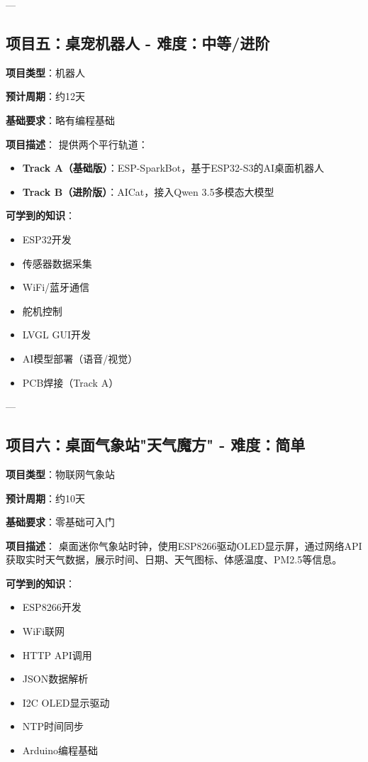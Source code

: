 \documentclass[12pt,a4paper]{article}
\begin{document}
---

\subsection{项目五：桌宠机器人 - 难度：中等/进阶}

\textbf{项目类型}：机器人

\textbf{预计周期}：约12天

\textbf{基础要求}：略有编程基础

\textbf{项目描述}：
提供两个平行轨道：
\begin{itemize}
    \item \textbf{Track A（基础版）}：ESP-SparkBot，基于ESP32-S3的AI桌面机器人
    \item \textbf{Track B（进阶版）}：AICat，接入Qwen 3.5多模态大模型
\end{itemize}

\textbf{可学到的知识}：
\begin{itemize}
    \item ESP32开发
    \item 传感器数据采集
    \item WiFi/蓝牙通信
    \item 舵机控制
    \item LVGL GUI开发
    \item AI模型部署（语音/视觉）
    \item PCB焊接（Track A）
\end{itemize}

---

\subsection{项目六：桌面气象站"天气魔方" - 难度：简单}

\textbf{项目类型}：物联网气象站

\textbf{预计周期}：约10天

\textbf{基础要求}：零基础可入门

\textbf{项目描述}：
桌面迷你气象站时钟，使用ESP8266驱动OLED显示屏，通过网络API获取实时天气数据，展示时间、日期、天气图标、体感温度、PM2.5等信息。

\textbf{可学到的知识}：
\begin{itemize}
    \item ESP8266开发
    \item WiFi联网
    \item HTTP API调用
    \item JSON数据解析
    \item I2C OLED显示驱动
    \item NTP时间同步
    \item Arduino编程基础
\end{itemize}
\end{document}
